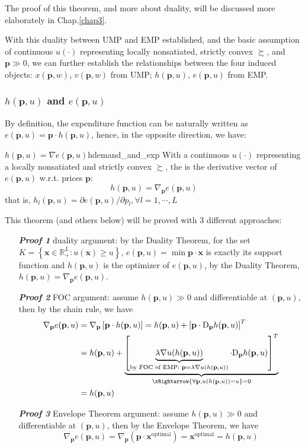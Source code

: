 The proof of this theorem, and more about duality, will be discussed more elaborately in Chap.\ref{chap3}.

With this duality between UMP and EMP established, and the basic assumption of continuous $u(\cdot)$ representing locally nonsatiated, strictly convex $\succsim$, and $\mathbf{p}\gg 0$, we can further establish the relationships between the four induced objects:  $x(\mathbf{p},w)$, $v(\mathbf{p},w)$ from UMP; $h(\mathbf{p},u)$, $e(\mathbf{p},u)$ from EMP.

\subsubsection*{$h(\mathbf{p},u)$ and $e(\mathbf{p},u)$}
By definition, the expenditure function can be naturally written as $e(\mathbf{p},u)=\mathbf{p}\cdot h(\mathbf{p},u)$, hence, in the opposite direction, we have:
\begin{theorem}{$h(\mathbf{p},u)=\nabla e(\mathbf{p},u)$}{hdemand_and_exp}
    With a continuous $u(\cdot)$ representing a locally nonsatiated and strictly convex $\succsim$, the  is the derivative vector of $e(\mathbf{p},u)$ w.r.t. prices $\mathbf{p}$:
    $$h(\mathbf{p},u)=\nabla_{\mathbf{p}}e(\mathbf{p},u)$$
    that is, $h_l(\mathbf{p},u)=\partial e(\mathbf{p},u)/\partial p_l,\forall l=1,\cdots,L$
\end{theorem}
This theorem (and others below) will be proved with 3 different approaches:
\begin{enumerate}
    \item[\textit{\textbf{Proof 1}}] duality argument: by the Duality Theorem, for the set $K=\left\{\mathbf{x}\in\mathbb{R}^L_+:u(\mathbf{x})\geq u \right\}$, $e(\mathbf{p},u)=\min\mathbf{p}\cdot\mathbf{x}$ is exactly its support function and $h(\mathbf{p},u)$ is the optimizer of $e(\mathbf{p},u)$, by the Duality Theorem, $h(\mathbf{p},u)=\nabla_{\mathbf{p}}e(\mathbf{p},u)$.
    \item[\textit{\textbf{Proof 2}}] FOC argument: assume $h(\mathbf{p},u)\gg 0$ and differentiable at $(\mathbf{p},u)$, then by the chain rule, we have 
    \begin{align*}
        \nabla_{\mathbf{p}}e(\mathbf{p},u)&=\nabla_{\mathbf{p}}\left[\mathbf{p}\cdot h(\mathbf{p},u)\right]=h(\mathbf{p},u)+\left[\mathbf{p}\cdot \mathrm{D}_{\mathbf{p}}h(\mathbf{p},u)\right]^T\\
        &=h(\mathbf{p},u)+\underbrace{\left[\underbrace{\lambda\nabla u(h(\mathbf{p},u))}_{\text{by FOC of EMP: }\mathbf{p}=\lambda\nabla u(h(\mathbf{p},u))} \cdot \mathrm{D}_{\mathbf{p}}h(\mathbf{p},u)\right]^T}_{\xRightarrow{\forall \mathbf{p},u(h(\mathbf{p},u))=u}=0}\\
        & = h(\mathbf{p},u)
    \end{align*}
    \item[\textit{\textbf{Proof 3}}] Envelope Theorem argument: assume $h(\mathbf{p},u)\gg 0$ and differentiable at $(\mathbf{p},u)$, then by the Envelope Theorem, we have 
    $$\nabla_{\mathbf{p}}e(\mathbf{p},u)=\nabla_{\mathbf{p}}(\mathbf{p}\cdot \mathbf{x}^{\text{optimal}})=\mathbf{x}^{\text{optimal}}=h(\mathbf{p},u)$$
\end{enumerate}

